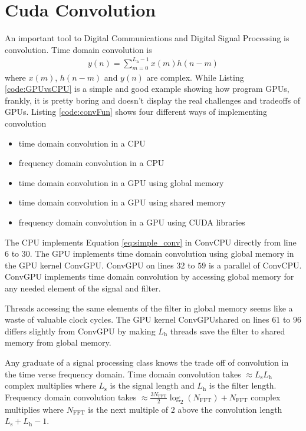 \section{Cuda Convolution}
An important tool to Digital Communications and Digital Signal Processing is convolution.
Time domain convolution is
\begin{align}
y(n) = \sum^{L_\text{h}-1}_{m=0} x(m) h(n-m)
	 \label{eq:simple_conv}
\end{align}
where $x(m)$, $h(n-m)$ and $y(n)$ are complex. 
While Listing \ref{code:GPUvsCPU} is a simple and good example showing how program GPUs, frankly, it is pretty boring and doesn't display the real challenges and tradeoffs of GPUs.
Listing \ref{code:convFun} shows four different ways of implementing convolution
\begin{itemize}
  \item time domain convolution in a CPU
  \item frequency domain convolution in a CPU
  \item time domain convolution in a GPU using global memory
  \item time domain convolution in a GPU using shared memory
  \item frequency domain convolution in a GPU using CUDA libraries
\end{itemize}
The CPU implements Equation \eqref{eq:simple_conv} in ConvCPU directly from line $6$ to $30$.
The GPU implements time domain convolution using global memory in the GPU kernel ConvGPU.
ConvGPU on lines $32$ to $59$ is a parallel of ConvCPU.
ConvGPU implements time domain convolution by accessing global memory for any needed element of the signal and filter.

Threads accessing the same elements of the filter in global memory seems like a waste of valuable clock cycles.
The GPU kernel ConvGPUshared on lines $61$ to $96$ differs slightly from ConvGPU by making $L_\text{h}$ threads save the filter to shared memory from global memory.

Any graduate of a signal processing class knows the trade off of convolution in the time verse frequency domain.
Time domain convolution takes $\approx L_\text{s} L_\text{h}$ complex multiplies where $L_\text{s}$ is the signal length and $L_\text{h}$ is the filter length.
Frequency domain convolution takes $\approx \frac{3 N_\text{FFT}}{2} \log_2(N_\text{FFT}) + N_\text{FFT}$ complex multiplies where $N_\text{FFT}$ is the next multiple of $2$ above the convolution length $L_\text{s}+L_\text{h}-1$.

